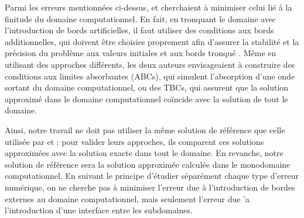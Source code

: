 \indent Parmi les erreurs mentionnées ci-dessus, \cite{zheng2008} et \cite{besse2015} cherchaient à minimiser celui lié à la finitude du domaine computationnel. En fait, en tronquant le domaine avec l'introduction de bords artificielles, il faut utiliser des conditions aux bords additionnelles, qui doivent être choisies proprement afin d'assurer la stabilité et la précision du problème aux valeurs initiales et aux bords tronqué \cite{zheng2008}. Même en utilisant des approches différents, les deux auteurs envisageaient à construire des conditions aux limites absorbantes (ABCs), qui simulent l'absorption d'une onde sortant du domaine computationnel, ou des TBCs, qui assurent que la solution approximé dans le domaine computationnel coïncide avec la solution de tout le domaine.

\indent Ainsi, notre travail ne doit pas utiliser la même solution de référence que celle utilisée par \cite{zheng2008} et \cite{besse2015} : pour valider leurs approches, ils comparent ces solutions approximées avec la solution exacte dans tout le domaine. En revanche, notre solution de référence sera la solution approximée calculée dans le monodomaine computationnel. En suivant le principe d'étudier séparément chaque type d'erreur numérique, on ne cherche pas à minimiser l'erreur due à l'introduction de bordes externes au domaine computationnel, mais seulement l'erreur due 'a l'introduction d'une interface entre les subdomaines.